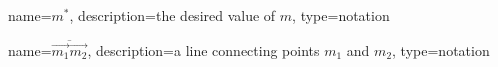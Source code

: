 	\newcommand{\desired}[1]{\ensuremath{{#1}^{*}}}
	{%
		name=\desired{m},
		description=the desired value of $m$,
		type=notation
	}

	\newcommand{\vecline}[2]{\ensuremath{\overline{#1#2}}}
	{%
		name=\ensuremath{\vecline{\vec{m_1}}{\vec{m_2}}},
		description=a line connecting points $m_1$ and $m_2$,
		type=notation
	}

	\newcommand{\interval}[1]{\ensuremath{\overbracket[0.1mm][0.5mm]{#1}}}


	\DeclarePairedDelimiter{\ceil}{\lceil}{\rceil}
	\DeclarePairedDelimiter{\floor}{\lfloor}{\rfloor}
	\DeclarePairedDelimiter{\abs}{\lvert}{\rvert}

	\DeclareMathOperator{\rank}{rank}

	\DeclareMathOperator{\diam}{diam}
	\DeclareMathOperator{\diag}{diag}
	\DeclareMathOperator*{\argmax}{arg\,max}
	\DeclareMathOperator*{\argmin}{arg\,min}
	\DeclareMathOperator{\dist}{dist}
	\newcommand{\defeq}{\coloneqq}
